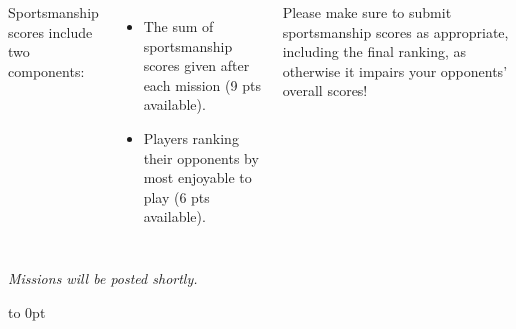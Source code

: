 \documentclass{40k}
\begin{document}
\begin{columns}
Sportsmanship scores include two components:
\begin{itemize}\shortlist
\item The sum of sportsmanship scores given after each mission (9 pts
  available).

\item Players ranking their opponents by most enjoyable to play (6 pts
  available).
\end{itemize}

Please make sure to submit sportsmanship scores as appropriate,
including the final ranking, as otherwise it impairs your opponents'
overall scores!

\end{columns}

\clearpage

\noindent\begin{minipage}[t][\textheight-6pt][t]{1.0\linewidth}
\vfill  
\centerline{\Huge\emph{Missions will be posted shortly.}}
\vfill
\vbox to 0pt{}
\end{minipage}
\end{document}
